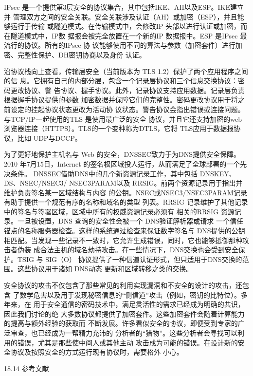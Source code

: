 IPsec 是一个提供第3层安全的协议集合，其中包括IKE、AH以及ESP。IKE建立并
管理双方之间的安全关联。安全关联涉及认证（AH）或加密（ESP），并且能够运行于传输
或隧道模式。在传输模式中，会修改IP 头部以进行认证或加密，而在隧道模式中，IP数
据报会被完全放置在一个新的IP 数据报中。ESP 是IPsec 最流行的协议。所有的IPsec 协
议能够使用不同的算法与参数（加密套件）进行加密、完整性保护、DH密钥协商以及身份
认证。

沿协议栈向上查看，传输层安全（当前版本为 TLS 1.2）保护了两个应用程序之间的信
息。它拥有自己的内部分层，包含一个记录层协议和三个信息交换协议：密码更改协议、警
告协议、握手协议。此外，记录协议支持应用数据。记录层负责根据握手协议提供的参数
加密数据并保障它们的完整性。密码更改协议用于将之前设定的挂起协议状态更改为活动协
议状态。警告协议会指出错误或连接问题。与TCP/IP一起使用的TLS 是使用最广泛的安全
协议，并且它还支持加密的web 浏览器连接（HTTPS）。TLS的一个变种称为DTLS，它将
TLS应用于数据报协议，比如 UDP与DCCP。

为了更好地保护主机名与 Web 的安全，DNSSEC致力于为DNS提供安全保障。2010
年7月15日，Internet 的签名根区域投人运行，从而满足了全球部署的一个先决条件。
DNSSEC借助DNS中的几个新资源记录工作，其中包括 DNSKEY、DS、NSEC/NSEC3/
NSEC3PARAM以及 RRSIG。前两个资源记录用于指出并维护负责签名某一区域结构与内容
的公钥。NSEC或NSEC3/NSEC3PARAM记录有助于提供一个规范有序的名称和域名的类型
列表。RRSIG 记录维护了其他记录中的签名与签署区域，区域中所有的权威资源记录必须有
相关的RRSIG 资源记录。一旦被设置，DNS 查询的安全性会被一个 DNS验证解析器或请求
一个信任锚点的名称服务器检查。这样的系统通过检查来保证数字签名与 DNS提供的公钥
相匹配。当发现一些记录不一致时，它允许生成错误，同时，它也能够抵御那种攻击者伪装
成合法主机的域名劫持攻击。在一些情况下，DNS交换也会受到安全保护。TSIG 与 SIG（O）
协议提供了一种信道认证形式，但只适用于DNS交换的范围。这些协议用于诸如 DNS动态
更新和区域转移之类的交换。

安全协议的攻击不仅包含了那些常见的利用实现漏洞和不安全的设计的攻击，还包含
了数学危害以及用于发现秘密信息的“侧信道”攻击（例如，密钥的比特位）。多年来，在
用于安全通信的密码技术中，满足灵活性的需求已经成为明确的共识，因此我们讨论的绝
大多数协议都提供了加密套件。这些加密套件会随着计算能力的提高与额外经验的获取而
不断发展。许多看似安全的协议，即便受到专家的广泛审查，也已经成为一帮精力充沛的
分析者的“猎物”。这些分析者会寻找可以利用的错误，尤其是那些使中间人或其他主动
攻击成为可能的错误。在设计新的安全协议及按照安全的方式运行现有协议时，需要格外
小心。


18.14 参考文献

